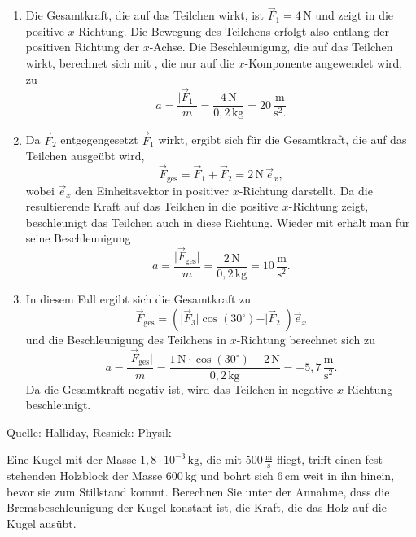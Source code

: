\begin{MExercises}
\begin{MExercise}
\begin{MSolution}
               \begin{enumerate}
               \item Die Gesamtkraft, die auf das Teilchen wirkt, ist  $\vec{F}_1= 4\,\text{N}$ und zeigt in die positive $x$-Richtung. Die Bewegung des Teilchens erfolgt also entlang der positiven Richtung der $x$-Achse. Die Beschleunigung, die auf das Teilchen wirkt, berechnet sich mit , die nur auf die $x$-Komponente angewendet wird, zu
               $$
               a=\frac{\vert\vec{F}_1\vert}{m}=\frac{4\,\text{N}}{{0,2}\,\text{kg}}=20\,\frac{\text{m}}{\text{s}^2.}
               $$
               \item Da $\vec{F}_2$ entgegengesetzt $\vec{F}_1$ wirkt, ergibt sich f\"ur die Gesamtkraft, die auf das Teilchen ausge\"ubt wird,
               $$
               \vec{F}_{\text{ges}}=\vec{F}_1+\vec{F}_2=2\,\text{N}\,\vec{e}_x,
               $$wobei $\vec{e}_x$ den Einheitsvektor in positiver $x$-Richtung darstellt. Da die resultierende Kraft auf das Teilchen in die positive $x$-Richtung zeigt, beschleunigt das Teilchen auch in diese Richtung. Wieder mit  erh\"alt man f\"ur seine Beschleunigung
               $$
               a=\frac{\vert\vec{F}_{\text{ges}}\vert}{m}=\frac{2\,\text{N}}{{0,2}\,\text{kg}}=10\,\frac{\text{m}}{\text{s}^2}.
               $$
               \item In diesem Fall ergibt sich die Gesamtkraft zu 
               $$
               \vec{F}_{\text{ges}}=\left(\vert \vec{F}_3\vert\cos(30^{\circ})-\vert\vec{F}_2\vert\right)\vec{e}_x
               $$und die Beschleunigung des Teilchens in $x$-Richtung berechnet sich zu
               $$
               a=\frac{\vert\vec{F}_{\text{ges}}\vert}{m}=\frac{1\,\text{N}\cdot\cos(30^{\circ})-2\,\text{N}}{{0,2}\,\text{kg}}=-{5,7}\,\frac{\text{m}}{\text{s}^2}.
               $$ Da die Gesamtkraft negativ ist, wird das Teilchen in negative $x$-Richtung beschleunigt.
               \end{enumerate}
               \end{MSolution}    
               
               Quelle: Halliday, Resnick: Physik
               \end{MExercise}
               \begin{MExercise}
               Eine Kugel mit der Masse ${1,8}\cdot 10^{-3}\,\text{kg}$, die mit $500\,\frac{\text{m}}{\text{s}}$ fliegt, trifft einen fest stehenden Holzblock der Masse $600\,\text{kg}$ und bohrt sich $6\, \text{cm}$ weit in ihn hinein, bevor sie zum Stillstand kommt. Berechnen Sie unter der Annahme, dass die Bremsbeschleunigung der Kugel konstant ist, die Kraft, die das Holz auf die Kugel aus\"ubt.
               

\end{MExercise}
\end{MExercises}
